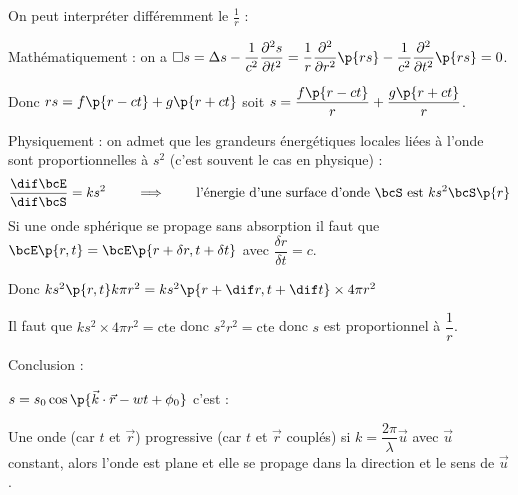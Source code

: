     On peut interpréter différemment le $\frac{1}{r}$ :
    \begin{enumerate}
        \itt Mathématiquement : on a $\Box s = \Delta s - \dfrac{1}{c^2}\dfrac{\partial^2 s}{\partial t^2} = \dfrac{1}{r}\dfrac{\partial^2}{\partial r^2}\p{rs} - \dfrac{1}{c^2}\dfrac{\partial^2}{\partial t^2}\p{rs} = 0$.
        
        Donc  $rs = f\p{r - ct} + g\p{r + ct}$ soit $s = \dfrac{f\p{r - ct}}{r} + \dfrac{g\p{r + ct}}{r}$.
        
        \itt Physiquement : on admet que les grandeurs énergétiques locales liées à l'onde sont proportionnelles à $s^2$ (c'est souvent le cas en physique) :
        \[ \dfrac{\dif \bcE}{\dif \bcS} = ks^2 \qquad\implies\qquad \text{l'énergie d'une surface d'onde $\bcS$ est $ks^2\bcS\p{r}$}\]
        Si une onde sphérique se propage sans absorption il faut que $\bcE\p{r, t} = \bcE\p{r + \delta r, t + \delta t}$ avec $\dfrac{\delta r}{\delta t} = c$.
        
        Donc $ks^2\p{r, t}k\pi r^2 = ks^2\p{r + \dif r, t + \dif t}\times 4\pi r^2$
        
        Il faut que $ks^2\times 4\pi r^2 = \text{cte}$ donc $s^2r^2 = \text{cte}$ donc $s$ est proportionnel à $\dfrac{1}{r}$.
        
    \end{enumerate}

    Conclusion : 
    
    $s = s_0 \cos \p{\vec k \cdot \vec r - w t + \phi_0}$ c'est :
    
    \begin{enumerate}
        \itt Une onde (car $t$ et $\vec r$)
        \itt progressive (car $t$ et $\vec r$ couplés)
        \itt si $k = \dfrac{2\pi}{\lambda}\vec u$ avec $\vec u$ constant, alors l'onde est plane et elle se propage dans la direction et le sens de $\vec u$.
    \end{enumerate}

